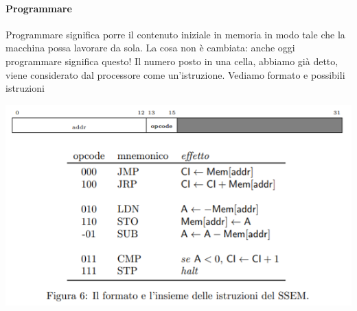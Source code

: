 \documentclass[11pt]{report}
\theoremstyle{definition}
\begin{document}
\paragraph{Programmare} Programmare significa porre il contenuto iniziale in memoria in modo tale che la macchina possa lavorare da sola. La cosa non è cambiata: anche oggi programmare significa questo! Il numero posto in una cella, abbiamo già detto, viene considerato dal processore come un'istruzione. Vediamo formato e possibili istruzioni
\begin{center}
\includegraphics{img/1.PNG}
\end{center}
\end{document}
